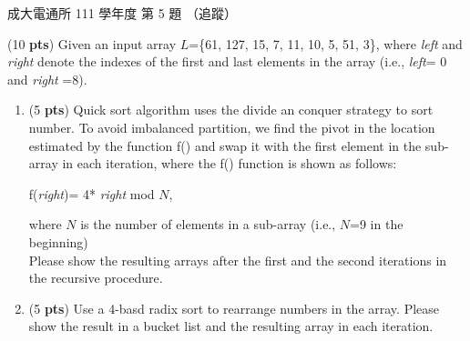 \begin{pastexam}[label={px:ncku-111-cce-ds-05}]{成大電通所 111 學年度 第 5 題}
（追蹤）

(10 \textbf{pts}) Given an input array $L$=\{61, 127, 15, 7, 11, 10, 5, 51, 3\}, where
\textit{left} and \textit{right} denote the indexes of the first and last elements in the array
(i.e., \textit{left}= 0 and \textit{right} =8).
\begin{enumerate}[label=\alph*.]
\item (5 \textbf{pts}) Quick sort algorithm uses the divide an conquer strategy to sort number. To
avoid imbalanced partition, we find the pivot in the location estimated by the function f() and
swap it with the first element in the sub-array in each iteration, where the f() function is
shown as follows:
\begin{center}f(\textit{right})= 4* \textit{right} mod $N$,\end{center}
where $N$ is the number of elements in a sub-array (i.e., $N$=9 in the beginning)\\
Please show the resulting arrays after the first and the second iterations in the recursive
procedure.
\item (5 \textbf{pts}) Use a 4-basd radix sort to rearrange numbers in the array. Please show the
result in a bucket list and the resulting array in each iteration.
\end{enumerate}
\end{pastexam}

